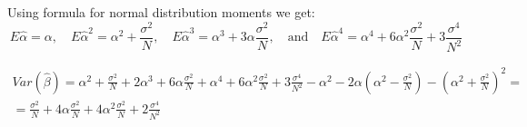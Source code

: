 \documentclass[12pt, a4paper]{article}\usepackage[]{graphicx}\usepackage[]{color}
\begin{document}
Using formula for normal distribution moments we get:
\[ E\hat{\alpha}=\alpha ,\quad E\hat{\alpha}^{2}=\alpha^{2}+\frac{\sigma^{2}}{N} ,\quad E\hat{\alpha}^{3}=\alpha^{3}+3\alpha\frac{\sigma^{2}}{N} ,\quad\text{and}\quad
E\hat{\alpha}^{4}=\alpha^{4}+6\alpha^{2}\frac{\sigma^{2}}{N}+3\frac{\sigma^{4}}{N^{2}}
\]

\begin{gather*}
Var(\hat{\beta})=\alpha^{2}+\frac{\sigma^{2}}{N}+2\alpha^{3}+6\alpha\frac{\sigma^{2}}{N}+\alpha^{4}+6\alpha^{2}\frac{\sigma^{2}}{N}+3\frac{\sigma^{4}}{N^{2}}
-\alpha^{2}-2\alpha\left(\alpha^{2}-\frac{\sigma^{2}}{N}\right) -\left(\alpha^{2}+\frac{\sigma^{2}}{N}\right)^{2}= \\
= \frac{\sigma^{2}}{N}+4\alpha\frac{\sigma^{2}}{N}+4\alpha^{2}\frac{\sigma^{2}}{N}+2\frac{\sigma^4}{N^{2}}
\end{gather*}


\end{document}

